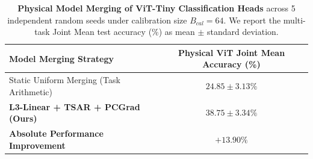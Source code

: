 \begin{table}[h]
\caption{\textbf{Physical Model Merging of ViT-Tiny Classification Heads} across 5 independent random seeds under calibration size $B_{cal}=64$. We report the multi-task Joint Mean test accuracy (\%) as mean $\pm$ standard deviation.}
\label{tab:physical_vit_results}
\vskip 0.15in
\begin{center}
\begin{small}
\begin{sc}
\begin{tabular}{lc}
\toprule
Model Merging Strategy & Physical ViT Joint Mean Accuracy (\%) \\
\midrule
Static Uniform Merging (Task Arithmetic) & $24.85 \pm 3.13\%$ \\
\textbf{L3-Linear + TSAR + PCGrad (Ours)} & $\mathbf{38.75 \pm 3.34\%}$ \\
\midrule
\textbf{Absolute Performance Improvement} & $\mathbf{+13.90\%}$ \\
\bottomrule
\end{tabular}
\end{sc}
\end{small}
\end{center}
\vskip -0.1in
\end{table}


